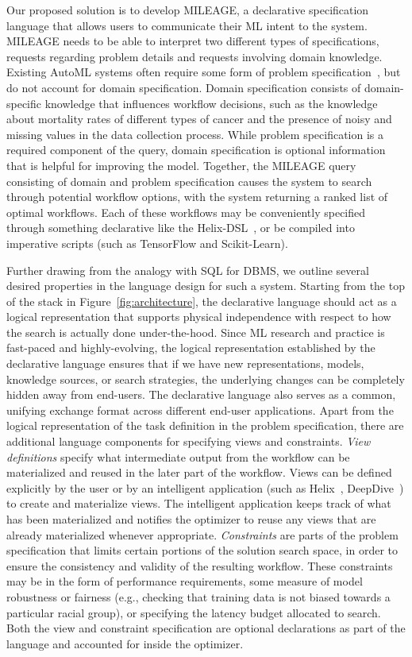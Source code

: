 \documentclass[11pt,dvipdfmx]{article}
\newcommand{\topic}[1]{\vspace{-3.5pt}\smallskip \smallskip \noindent{\bf #1.}}
\newcommand{\systemLang}{{\sf MILEAGE}\xspace}
\begin{document}
\topic{\systemLang Improvements}
Our proposed solution is to develop \systemLang, a declarative specification language that
allows users to communicate their ML intent to the system. \systemLang needs to be able to interpret two different types of specifications,
requests regarding problem details and requests involving domain knowledge.
Existing AutoML systems often require some form of problem
specification~\cite{H2O,azureAutoML,golovin2017google}, but do not account for domain specification. Domain specification consists of domain-specific
knowledge that influences workflow decisions, such as the knowledge about
mortality rates of different types of cancer and the presence of noisy and
missing values in the data collection process. While problem specification is
a required component of the query, domain specification is optional
information that is helpful for improving the model. Together, the \systemLang query
consisting of domain and problem specification causes the system to search
through potential workflow options, with the system returning a ranked list of
optimal workflows. Each of these workflows may be conveniently specified
through something declarative like the Helix-DSL~\cite{xin2018helix}, or be
compiled into imperative scripts (such as TensorFlow and Scikit-Learn). 

Further drawing from the analogy with SQL for
DBMS, we outline several desired properties in
the language design for such a system. Starting from the top of the stack in
Figure~\ref{fig:architecture}, the declarative language should act as a logical
representation that supports physical independence with respect to how the
search is actually done under-the-hood. Since ML research and practice is
fast-paced and highly-evolving, the logical representation established by the
declarative language ensures that if we have new representations, models,
knowledge sources, or search strategies, the underlying changes can be
completely hidden away from end-users. The declarative language also serves as
a common, unifying exchange format across different end-user applications.
Apart from the logical representation of the task definition in the problem
specification, there are additional language components for specifying views
and constraints.
\emph{View definitions} specify what intermediate output from the workflow can
be materialized and reused in the later part of the workflow.
Views can be defined explicitly by the user or by an intelligent
application (such as Helix~\cite{xin2018helix}, DeepDive~\cite{Shin2015}) to
create and materialize views. The intelligent application keeps track of what
has been materialized and notifies the optimizer to reuse any views that are
already materialized whenever appropriate.
\emph{Constraints} are parts of the problem specification that limits certain
portions of the solution search space, in order to ensure the consistency and
validity of the resulting workflow. These constraints may be in the form of
performance requirements, some measure of model robustness or fairness (e.g.,
checking that training data is not biased towards a particular racial group),
or specifying the latency budget allocated to search. Both the view and
constraint specification are optional declarations as part of the language and
accounted for inside the optimizer. 
\end{document}
